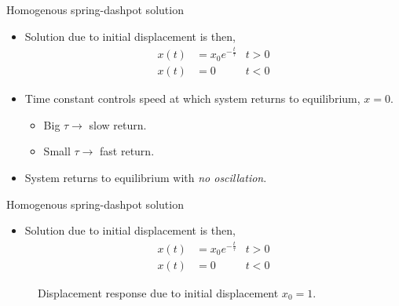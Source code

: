 \documentclass[11pt,aspectratio=169,handout]{beamer}
\begin{document}
\begin{frame}[c]{Homogenous spring-dashpot solution}
	\begin{itemize}
		\item<1->  Solution due to initial displacement is then, 
		\begin{align}
			x(t) &= x_0 e^{-\frac{t}{\tau}}   & t>0  \\
			x(t) &= 0  & t<0  
		\end{align}
	\item<2-> Time constant controls speed at which system returns to equilibrium, $x=0$.
	\begin{itemize}
		\item[-] Big $\tau \rightarrow$ slow return. 
		\item[-] Small $\tau \rightarrow$ fast return.
	\end{itemize}
	\item System returns to equilibrium with \textit{no oscillation}.
	\end{itemize}
\end{frame}

\begin{frame}[c]{Homogenous spring-dashpot solution}
	\begin{itemize}
		\item<1->  Solution due to initial displacement is then, 
		\begin{align}
			x(t) &= x_0 e^{-\frac{t}{\tau}}   & t>0  \\
			x(t) &= 0  & t<0  
		\end{align}
	\end{itemize}
\vspace{-0.5cm}
	\begin{figure}[]
		\centering
		
		\caption{Displacement response due to initial displacement $x_0 = 1$.}
	\end{figure}
\end{frame}
\end{document}

